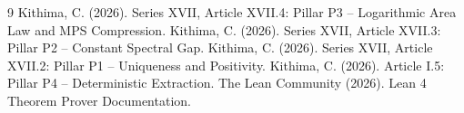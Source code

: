 \documentclass[11pt,a4paper]{article}
\begin{document}

\begin{thebibliography}{9}
  Kithima, C. (2026). Series XVII, Article XVII.4: Pillar P3 – Logarithmic Area Law and MPS Compression.
  Kithima, C. (2026). Series XVII, Article XVII.3: Pillar P2 – Constant Spectral Gap.
  Kithima, C. (2026). Series XVII, Article XVII.2: Pillar P1 – Uniqueness and Positivity.
  Kithima, C. (2026). Article I.5: Pillar P4 – Deterministic Extraction.
  The Lean Community (2026). Lean 4 Theorem Prover Documentation.
\end{thebibliography}
\end{document}

